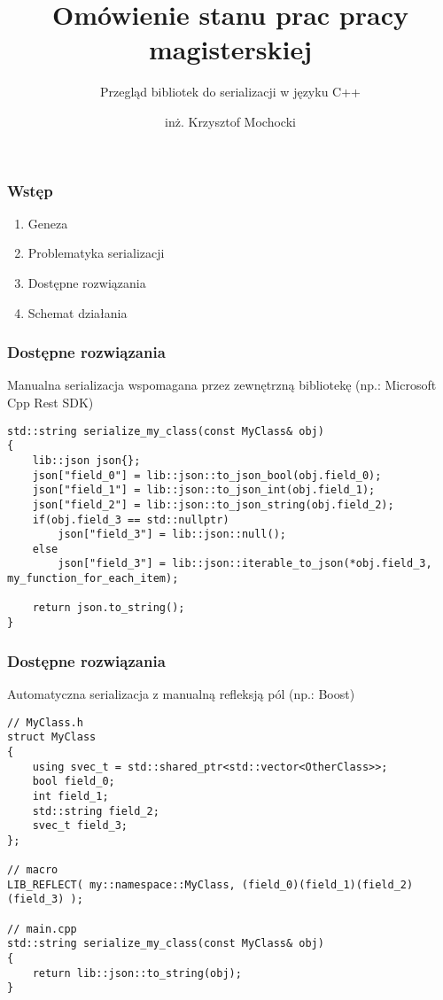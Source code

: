 \documentclass[12pt]{beamer}
\title{Omówienie stanu prac pracy magisterskiej}
\subtitle{Przegląd bibliotek do serializacji w języku C++}
\author[inż. Krzysztof Mochocki]{inż. Krzysztof Mochocki}
\date{}
\begin{document}
	\begin{frame}
		\maketitle
	\end{frame}

	\begin{frame}
		\frametitle{Wstęp}
		\begin{enumerate}
			\item Geneza
			\item Problematyka serializacji
			\item Dostępne rozwiązania
			\item Schemat działania
		\end{enumerate}
	\end{frame}

	\begin{frame}[fragile]
		\frametitle{Dostępne rozwiązania}

		Manualna serializacja wspomagana przez zewnętrzną bibliotekę (np.: Microsoft Cpp Rest SDK)\newline

		\begin{lstlisting}[frame=single]
std::string serialize_my_class(const MyClass& obj)
{
	lib::json json{};
	json["field_0"] = lib::json::to_json_bool(obj.field_0);
	json["field_1"] = lib::json::to_json_int(obj.field_1);
	json["field_2"] = lib::json::to_json_string(obj.field_2);
	if(obj.field_3 == std::nullptr)
		json["field_3"] = lib::json::null();
	else
		json["field_3"] = lib::json::iterable_to_json(*obj.field_3, my_function_for_each_item);

	return json.to_string();
}
		\end{lstlisting}

	\end{frame}

	\begin{frame}[fragile]
		\frametitle{Dostępne rozwiązania}

		Automatyczna serializacja z manualną refleksją pól \newline(np.: Boost)

		\begin{lstlisting}[frame=single]
// MyClass.h
struct MyClass
{
	using svec_t = std::shared_ptr<std::vector<OtherClass>>;
	bool field_0;
	int field_1;
	std::string field_2;
	svec_t field_3;
};

// macro
LIB_REFLECT( my::namespace::MyClass, (field_0)(field_1)(field_2)(field_3) );

// main.cpp
std::string serialize_my_class(const MyClass& obj)
{
	return lib::json::to_string(obj);
}
		\end{lstlisting}

	\end{frame}
\end{document}

